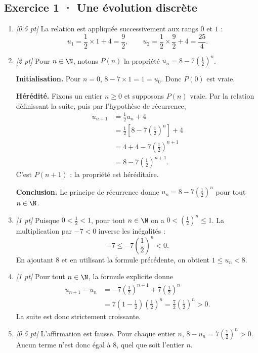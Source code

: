 \subsection*{Exercice 1 · Une évolution discrète}\begin{enumerate}

\item \textit{[\num{0,5} pt]} La relation est appliquée successivement aux rangs $0$ et $1$ :\[u_1=\frac{1}{2}\times 1+4=\frac{9}{2},\qquad u_2=\frac{1}{2}\times \frac{9}{2}+4=\frac{25}{4}.\]

\item \textit{[2 pt]} Pour $n\in\N$, notons $P(n)$ la propriété $u_n=8-7\left(\frac{1}{2}\right)^n$.
\par\smallskip\textbf{Initialisation.} Pour $n=0$, $8-7\times1=1=u_0$. Donc $P(0)$ est vraie.
\par\smallskip\textbf{Hérédité.} Fixons un entier $n\ge0$ et supposons $P(n)$ vraie. Par la relation définissant la suite, puis par l'hypothèse de récurrence,
\[\begin{aligned}u_{n+1}&=\frac{1}{2}u_n+4\\
&=\frac{1}{2}\left[8-7\left(\frac{1}{2}\right)^n\right]+4\\
&=4+4-7\left(\frac{1}{2}\right)^{n+1}\\
&=8-7\left(\frac{1}{2}\right)^{n+1}.
\end{aligned}\]
C'est $P(n+1)$ : la propriété est héréditaire.
\par\smallskip\textbf{Conclusion.} Le principe de récurrence donne $u_n=8-7\left(\frac{1}{2}\right)^n$ pour tout $n\in\N$.

\item \textit{[1 pt]} Puisque $0<\frac{1}{2}<1$, pour tout $n\in\N$ on a $0<(\frac{1}{2})^n\le1$. La multiplication par $-7<0$ inverse les inégalités :
\[-7\le-7(\frac{1}{2})^n<0.\]
En ajoutant $8$ et en utilisant la formule précédente, on obtient $1\le u_n<8$.

\item \textit{[1 pt]} Pour tout $n\in\N$, la formule explicite donne
\[\begin{aligned}u_{n+1}-u_n&=-7(\frac{1}{2})^{n+1}+7(\frac{1}{2})^n\\&=7(1-\frac{1}{2})(\frac{1}{2})^n=\frac{7}{2}(\frac{1}{2})^n>0.\end{aligned}\]
La suite est donc strictement croissante.

\item \textit{[\num{0,5} pt]} L'affirmation est fausse. Pour chaque entier $n$, $8-u_n=7(\frac{1}{2})^n>0$. Aucun terme n'est donc égal à $8$, quel que soit l'entier $n$.

\end{enumerate}

